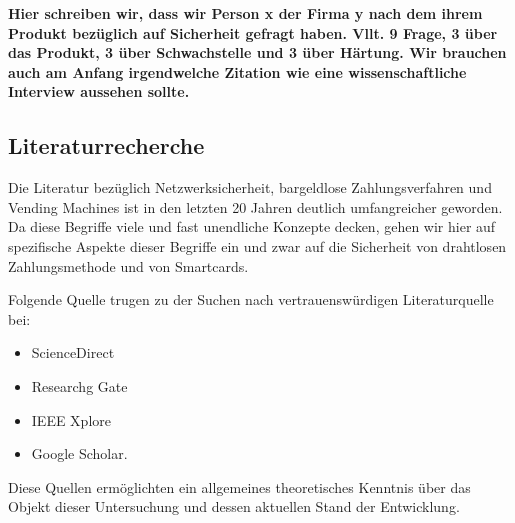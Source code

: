 \textbf{Hier schreiben wir, dass wir Person x der Firma y nach dem ihrem Produkt bezüglich auf Sicherheit gefragt haben.
Vllt. 9 Frage, 3 über das Produkt, 3 über Schwachstelle und 3 über Härtung. Wir brauchen auch am Anfang irgendwelche Zitation
wie eine wissenschaftliche Interview aussehen sollte.}

\subsection{Literaturrecherche}

Die Literatur bezüglich Netzwerksicherheit, bargeldlose Zahlungsverfahren und Vending Machines ist in den 
letzten 20 Jahren deutlich umfangreicher geworden. Da diese Begriffe viele und fast unendliche Konzepte 
decken, gehen wir hier auf spezifische Aspekte dieser Begriffe ein und zwar auf die Sicherheit von drahtlosen 
Zahlungsmethode und von Smartcards. 

Folgende Quelle trugen zu der Suchen nach vertrauenswürdigen Literaturquelle bei:

\begin{itemize}
    \item ScienceDirect
    \item Researchg Gate
    \item IEEE Xplore
    \item Google Scholar.
\end{itemize}

Diese Quellen ermöglichten ein allgemeines theoretisches Kenntnis über das Objekt dieser Untersuchung und dessen aktuellen 
Stand der Entwicklung.
